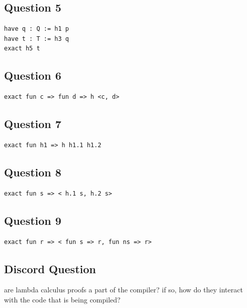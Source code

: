 \documentclass{article}
\theoremstyle{plain}
\theoremstyle{definition}
\theoremstyle{remark}
\begin{document}
\subsection{Question 5}

\begin{lstlisting}
have q : Q := h1 p
have t : T := h3 q
exact h5 t
\end{lstlisting}

\subsection{Question 6}

\begin{lstlisting}
exact fun c => fun d => h <c, d>
\end{lstlisting}

\subsection{Question 7}

\begin{lstlisting}
exact fun h1 => h h1.1 h1.2
\end{lstlisting}

\subsection{Question 8}

\begin{lstlisting}
exact fun s => < h.1 s, h.2 s>
\end{lstlisting}

\subsection{Question 9}

\begin{lstlisting}
exact fun r => < fun s => r, fun ns => r>
\end{lstlisting}

\subsection{Discord Question}

are lambda calculus proofs a part of the compiler? if so, how do they interact with the code that is being compiled?
\end{document}
